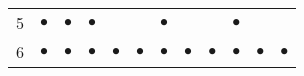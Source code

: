\begin{table}[ht!]
\begin{tabular}{cccccccccccc}
5                      & $\bullet$                  & $\bullet$                                                                   & $\bullet$                   &                             &                             & $\bullet$                   &                             &                             & $\bullet$                   &                             &           \\
6                      & $\bullet$                  & $\bullet$                                                                   & $\bullet$                   & $\bullet$                   & $\bullet$                   & $\bullet$                   & $\bullet$                   & $\bullet$                   & $\bullet$                   & $\bullet$                   & $\bullet$ \\ \hline
\end{tabular}
\end{table}
